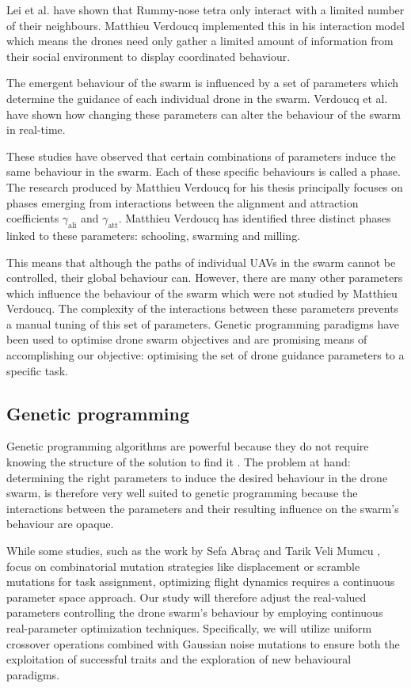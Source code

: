 \documentclass[conference]{IEEEtran}
\begin{document}
Lei et al. \cite{lei_computational_2020} have shown that Rummy-nose tetra only interact with a limited number of their neighbours. Matthieu Verdoucq implemented this in his interaction model which means the drones need only gather a limited amount of information from their social environment to display coordinated behaviour.  

The emergent behaviour of the swarm is influenced by a set of parameters which determine the guidance of each individual drone in the swarm. Verdoucq et al. \cite{verdoucq_flocking_2025} have shown how changing these parameters can alter the behaviour of the swarm in real-time.

These studies have observed that certain combinations of parameters induce the same behaviour in the swarm. Each of these specific behaviours is called a phase. The research produced by Matthieu Verdoucq for his thesis principally focuses on phases emerging from interactions between the alignment and attraction coefficients $\gamma_{\text{ali}}$ and $\gamma_{\text{att}}$. Matthieu Verdoucq \cite{verdoucq_controbio-inspire_2024} has identified three distinct phases linked to these parameters: schooling, swarming and milling. 

This means that although the paths of individual UAVs in the swarm cannot be controlled, their global behaviour can. However, there are many other parameters which influence the behaviour of the swarm which were not studied by Matthieu Verdoucq. The complexity of the interactions between these parameters prevents a manual tuning of this set of parameters. Genetic programming paradigms have been used to optimise drone swarm objectives and are promising means of accomplishing our objective: optimising the set of drone guidance parameters to a specific task.

\subsection{Genetic programming}

Genetic programming algorithms are powerful because they do not require knowing the structure of the solution to find it \cite{poli_field_2008}. The problem at hand: determining the right parameters to induce the desired behaviour in the drone swarm, is therefore very well suited to genetic programming because the interactions between the parameters and their resulting influence on the swarm's behaviour are opaque.

While some studies, such as the work by Sefa Abraç and Tarik Veli Mumcu \cite{arbac_multi-objective_2025}, focus on combinatorial mutation strategies like displacement or scramble mutations for task assignment, optimizing flight dynamics requires a continuous parameter space approach. Our study will therefore adjust the real-valued parameters controlling the drone swarm's behaviour by employing continuous real-parameter optimization techniques. Specifically, we will utilize uniform crossover operations combined with Gaussian noise mutations to ensure both the exploitation of successful traits and the exploration of new behavioural paradigms.
\end{document}

